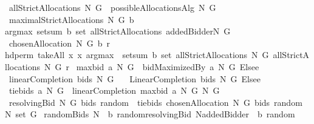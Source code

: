 \begin{isabellebody}
%
\endisatagproof
{\isafoldproof}%
%
\isadelimproof
\isanewline
%
\endisadelimproof
\isanewline
{}\isamarkupfalse%
\ {\isachardoublequoteopen}allStrictAllocations\ N\ G\ {\isacharequal}{\isacharequal}\ possibleAllocationsAlg{}\ N\ G{\isachardoublequoteclose}\isanewline
{}\isamarkupfalse%
\ {\isachardoublequoteopen}maximalStrictAllocations\ N\ G\ b{\isacharequal}{\isacharequal}\isanewline
argmax\ {\isacharparenleft}setsum\ b{\isacharparenright}\ {\isacharparenleft}set\ {\isacharparenleft}allStrictAllocations\ {\isacharparenleft}{\isacharbraceleft}addedBidder{\isacharprime}{\isacharbraceright}{\isasymunion}N{\isacharparenright}\ G{\isacharparenright}{\isacharparenright}{\isachardoublequoteclose}\isanewline
\isanewline
{}\isamarkupfalse%
\ {\isachardoublequoteopen}chosenAllocation\ N\ G\ b\ r\ {\isacharequal}{\isacharequal}\ \isanewline
hd{\isacharparenleft}perm{}\ {\isacharparenleft}takeAll\ {\isacharparenleft}{\isacharpercent}x{\isachardot}\ x{\isasymin}\ {\isacharparenleft}argmax\ {\isasymcirc}\ setsum{\isacharparenright}\ b\ {\isacharparenleft}set\ {\isacharparenleft}allStrictAllocations\ N\ G{\isacharparenright}{\isacharparenright}{\isacharparenright}\ {\isacharparenleft}allStrictAllocations\ N\ G{\isacharparenright}{\isacharparenright}\ r{\isacharparenright}{\isachardoublequoteclose}\isanewline
{}\isamarkupfalse%
\ {\isachardoublequoteopen}maxbid\ a\ N\ G\ {\isacharequal}{\isacharequal}\ {\isacharparenleft}bidMaximizedBy\ a\ N\ G{\isacharparenright}\ Elsee\ {}{\isachardoublequoteclose}\isanewline
{}\isamarkupfalse%
\ {\isachardoublequoteopen}linearCompletion\ {\isacharparenleft}bids{\isacharparenright}\ N\ G\ {\isacharequal}{\isacharequal}\ \isanewline
\ {\isacharparenleft}LinearCompletion\ bids\ N\ G{\isacharparenright}\ Elsee\ {}{\isachardoublequoteclose}\isanewline
{}\isamarkupfalse%
\ {\isachardoublequoteopen}tiebids\ a\ N\ G\ {\isacharequal}{\isacharequal}\ linearCompletion\ {\isacharparenleft}maxbid\ a\ N\ G{\isacharparenright}\ N\ G{\isachardoublequoteclose}\isanewline
{}\isamarkupfalse%
\ {\isachardoublequoteopen}resolvingBid\ N\ G\ bids\ random\ {\isacharequal}{\isacharequal}\ tiebids\ {\isacharparenleft}chosenAllocation\ N\ G\ bids\ random{\isacharparenright}\ N\ {\isacharparenleft}set\ G{\isacharparenright}{\isachardoublequoteclose}\isanewline
{}\isamarkupfalse%
\ {\isachardoublequoteopen}randomBids\ N\ {\isasymOmega}\ b\ random{\isacharequal}{\isacharequal}resolvingBid\ {\isacharparenleft}N{\isasymunion}{\isacharbraceleft}addedBidder{\isacharprime}{\isacharbraceright}{\isacharparenright}\ {\isasymOmega}\ b\ random{\isachardoublequoteclose}\isanewline

\end{isabellebody}
